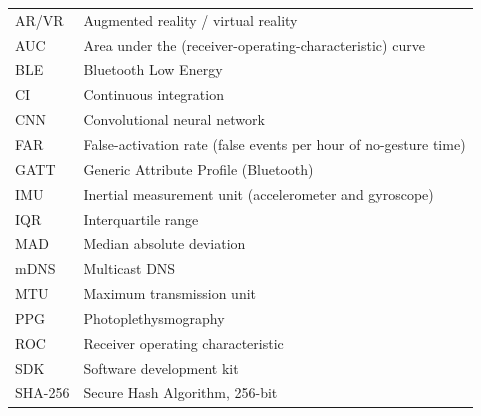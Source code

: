 \begin{tabular}{@{}ll@{}}
AR/VR & Augmented reality / virtual reality \\
AUC & Area under the (receiver-operating-characteristic) curve \\
BLE & Bluetooth Low Energy \\
CI & Continuous integration \\
CNN & Convolutional neural network \\
FAR & False-activation rate (false events per hour of no-gesture time) \\
GATT & Generic Attribute Profile (Bluetooth) \\
IMU & Inertial measurement unit (accelerometer and gyroscope) \\
IQR & Interquartile range \\
MAD & Median absolute deviation \\
mDNS & Multicast DNS \\
MTU & Maximum transmission unit \\
PPG & Photoplethysmography \\
ROC & Receiver operating characteristic \\
SDK & Software development kit \\
SHA-256 & Secure Hash Algorithm, 256-bit \\
\end{tabular}
